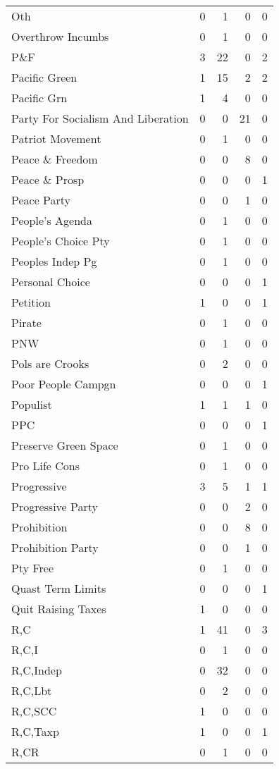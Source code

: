 \begin{supertabular}{lrrrr}
Oth & 0 & 1 & 0 & 0\\
Overthrow Incumbs & 0 & 1 & 0 & 0\\
P\&F & 3 & 22 & 0 & 2\\
Pacific Green & 1 & 15 & 2 & 2\\
Pacific Grn & 1 & 4 & 0 & 0\\
Party For Socialism And Liberation & 0 & 0 & 21 & 0\\
Patriot Movement & 0 & 1 & 0 & 0\\
Peace \& Freedom & 0 & 0 & 8 & 0\\
Peace \& Prosp & 0 & 0 & 0 & 1\\
Peace Party & 0 & 0 & 1 & 0\\
People's Agenda & 0 & 1 & 0 & 0\\
People's Choice Pty & 0 & 1 & 0 & 0\\
Peoples Indep Pg & 0 & 1 & 0 & 0\\
Personal Choice & 0 & 0 & 0 & 1\\
Petition & 1 & 0 & 0 & 1\\
Pirate & 0 & 1 & 0 & 0\\
PNW & 0 & 1 & 0 & 0\\
Pols are Crooks & 0 & 2 & 0 & 0\\
Poor People Campgn & 0 & 0 & 0 & 1\\
Populist & 1 & 1 & 1 & 0\\
PPC & 0 & 0 & 0 & 1\\
Preserve Green Space & 0 & 1 & 0 & 0\\
Pro Life Cons & 0 & 1 & 0 & 0\\
Progressive & 3 & 5 & 1 & 1\\
Progressive Party & 0 & 0 & 2 & 0\\
Prohibition & 0 & 0 & 8 & 0\\
Prohibition Party & 0 & 0 & 1 & 0\\
Pty Free & 0 & 1 & 0 & 0\\
Quast Term Limits & 0 & 0 & 0 & 1\\
Quit Raising Taxes & 1 & 0 & 0 & 0\\
R,C & 1 & 41 & 0 & 3\\
R,C,I & 0 & 1 & 0 & 0\\
R,C,Indep & 0 & 32 & 0 & 0\\
R,C,Lbt & 0 & 2 & 0 & 0\\
R,C,SCC & 1 & 0 & 0 & 0\\
R,C,Taxp & 1 & 0 & 0 & 1\\
R,CR & 0 & 1 & 0 & 0\\

\end{supertabular}
